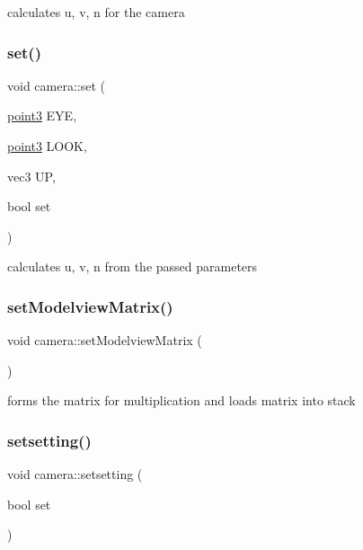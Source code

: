 calculates u, v, n for the camera \hypertarget{classcamera_aa5561aba012714e140ff11ac2544ff56}{}\label{classcamera_aa5561aba012714e140ff11ac2544ff56} 
\subsubsection{\texorpdfstring{set()}{set()}\hspace{0.1cm}{\footnotesize\ttfamily [2/2]}}
{\footnotesize\ttfamily void camera\+::set (\begin{DoxyParamCaption}\item[{\hyperlink{classpoint3}{point3}}]{E\+YE,  }\item[{\hyperlink{classpoint3}{point3}}]{L\+O\+OK,  }\item[{vec3}]{UP,  }\item[{bool}]{set }\end{DoxyParamCaption})}

calculates u, v, n from the passed parameters \hypertarget{classcamera_adb0b12de88728a7b9e122ea950f8cad1}{}\label{classcamera_adb0b12de88728a7b9e122ea950f8cad1} 
\subsubsection{\texorpdfstring{set\+Modelview\+Matrix()}{setModelviewMatrix()}}
{\footnotesize\ttfamily void camera\+::set\+Modelview\+Matrix (\begin{DoxyParamCaption}{ }\end{DoxyParamCaption})\hspace{0.3cm}{\ttfamily [private]}}

forms the matrix for multiplication and loads matrix into stack \hypertarget{classcamera_a32324b26eeec589c67d6a57bdf6d569d}{}\label{classcamera_a32324b26eeec589c67d6a57bdf6d569d} 
\subsubsection{\texorpdfstring{setsetting()}{setsetting()}}
{\footnotesize\ttfamily void camera\+::setsetting (\begin{DoxyParamCaption}\item[{bool}]{set }\end{DoxyParamCaption})}

